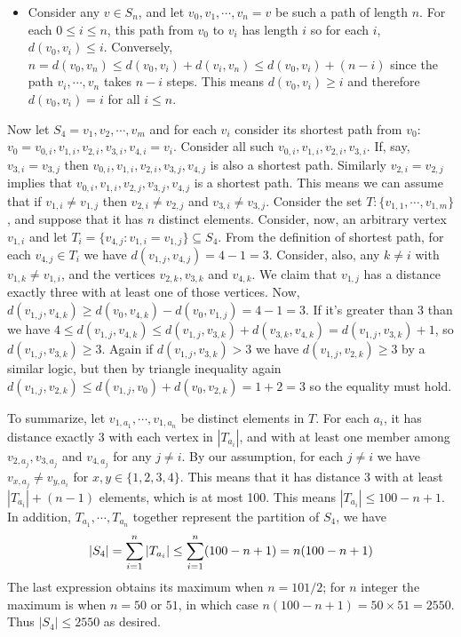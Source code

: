 \documentclass[11pt,a4paper]{article}
\begin{document}
\begin{enumerate}
\begin{itemize}
		\item Consider any $v\in S_n$, and let $v_0, v_1, \cdots , v_n=v$ be such a path of length $n$. For each $0\le i\le n$, this path from $v_0$ to $v_i$ has length $i$ so for each $i$, $d(v_0, v_i)\le i$. Conversely, $n=d(v_0, v_n)\le d(v_0, v_i)+d(v_i, v_n)\le d(v_0, v_i)+(n-i)$ since the path $v_i, \cdots , v_n$ takes $n-i$ steps. This means $d(v_0, v_i)\ge i$ and therefore $d(v_0, v_i)=i$ for all $i\le n$. 
	\end{itemize}
	Now let $S_4=v_1, v_2, \cdots , v_m$ and for each $v_i$ consider its shortest path from $v_0$: $v_0=v_{0, i}, v_{1, i}, v_{2, i}, v_{3, i}, v_{4, i}=v_i$. Consider all such $v_{0, i}, v_{1, i}, v_{2, i}, v_{3, i}$. If, say, $v_{3, i}=v_{3, j}$ then $v_{0, i}, v_{1, i}, v_{2, i}, v_{3, j}, v_{4, j}$ is also a shortest path. Similarly $v_{2, i}=v_{2, j}$ implies that $v_{0, i}, v_{1, i}, v_{2, j}, v_{3, j}, v_{4, j}$ is a shortest path. 
	This means we can assume that if $v_{1, i}\neq v_{1, j}$ then $v_{2, i}\neq v_{2, j}$ and $v_{3, i}\neq v_{3, j}$. 
	Consider the set $T: \{v_{1, 1}, \cdots , v_{1, m}\}$, and suppose that it has $n$ distinct elements. 
	Consider, now, an arbitrary vertex $v_{1, i}$ and let $T_i = \{v_{4, j}: v_{1, i}=v_{1, j}\}\subseteq S_4$. 
	From the definition of shortest path, for each $v_{4, j}\in T_i$ we have $d(v_{1, j}, v_{4, j})=4-1=3$. 
	Consider, also, any $k\neq i$ with $v_{1, k}\neq v_{1, i}$, and the vertices $v_{2, k}, v_{3, k}$ and $v_{4, k}$. We claim that $v_{1, j}$ has a distance exactly three with at least one of those vertices. 
	Now, $d(v_{1, j}, v_{4, k})\ge d(v_0, v_{4, k}) - d(v_0, v_{1, j})=4-1=3$. If it's greater than 3 than we have 
	$4\le d(v_{1, j}, v_{4, k})\le d(v_{1, j}, v_{3, k}) + d(v_{3, k}, v_{4, k}) = d(v_{1, j}, v_{3, k}) + 1$, so $d(v_{1, j}, v_{3, k})\ge 3$. Again if $d(v_{1, j}, v_{3, k}) > 3$ we have $d(v_{1, j}, v_{2, k})\ge 3$ by a similar logic, but then by triangle inequality again $d(v_{1, j}, v_{2, k})\le d(v_{1, j}, v_0)+d(v_0, v_{2, k})=1+2=3$ so the equality must hold. 
	
	To summarize, let $v_{1, a_1}, \cdots , v_{1, a_n}$ be distinct elements in $T$. For each $a_i$, it has distance exactly 3 with each vertex in $|T_{a_i}|$, and with at least one member among $v_{2, a_j}, v_{3, a_j}$ and $v_{4, a_j}$ for any $j\neq i$. By our assumption, for each $j\neq i$ we have $v_{x, a_j}\neq v_{y, a_i}$ for $x, y\in \{1, 2, 3, 4\}$. This means that it has distance 3 with at least $|T_{a_i}|+(n-1)$ elements, which is at most 100. This means $|T_{a_i}|\le 100-n+1$. In addition, $T_{a_1}, \cdots , T_{a_n}$ together represent the partition of $S_4$, we have 
	\[
	|S_4|=\displaystyle\sum_{i=1}^n |T_{a_i}|\le \displaystyle\sum_{i=1}^n (100-n+1) = n(100-n+1)
	\]
	The last expression obtains its maximum when $n=101/2$; for $n$ integer the maximum is when $n=50$ or $51$, in which case $n(100-n+1)=50\times 51 = 2550$. Thus $|S_4|\le 2550$ as desired. 
	
\end{enumerate}
\end{document}
